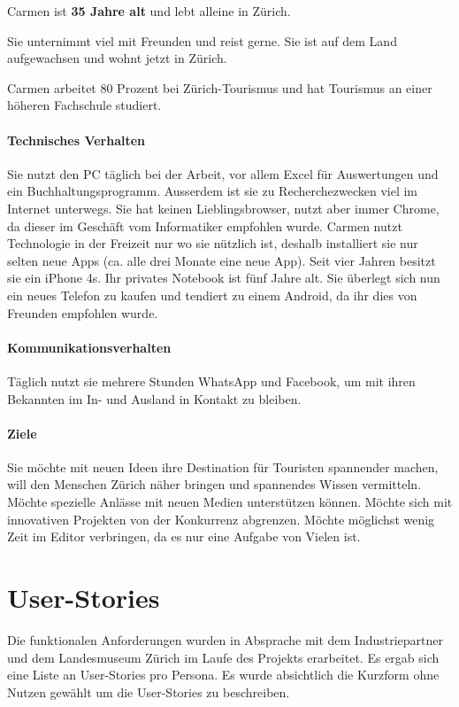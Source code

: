 Carmen ist \textbf{35 Jahre alt} und lebt alleine in Zürich.

Sie unternimmt viel mit Freunden und reist gerne. Sie ist auf dem Land aufgewachsen und wohnt jetzt in Zürich. 

Carmen arbeitet 80 Prozent bei Zürich-Tourismus und hat Tourismus an einer höheren Fachschule studiert.

\paragraph{Technisches Verhalten} 
Sie nutzt den PC täglich bei der Arbeit, vor allem Excel für Auswertungen und ein Buchhaltungsprogramm. Ausserdem ist sie zu Recherchezwecken viel im Internet unterwegs. Sie hat keinen Lieblingsbrowser, nutzt aber immer Chrome, da dieser im Geschäft vom Informatiker empfohlen wurde. Carmen nutzt Technologie in der Freizeit nur wo sie nützlich ist, deshalb installiert sie nur selten neue Apps (ca. alle drei Monate eine neue App). Seit vier Jahren besitzt sie ein iPhone 4s. Ihr privates Notebook ist fünf Jahre alt. Sie überlegt sich nun ein neues Telefon zu kaufen und tendiert zu einem Android, da ihr dies von Freunden empfohlen wurde. 

\paragraph{Kommunikationsverhalten}
Täglich nutzt sie mehrere Stunden WhatsApp und Facebook, um mit ihren Bekannten im In- und Ausland in Kontakt zu bleiben.

\paragraph{Ziele} 
Sie möchte mit neuen Ideen ihre Destination für Touristen spannender machen, will den Menschen Zürich näher bringen und spannendes Wissen vermitteln. Möchte spezielle Anlässe mit neuen Medien unterstützen können. Möchte sich mit innovativen Projekten von der Konkurrenz abgrenzen. Möchte möglichst wenig Zeit im Editor verbringen, da es nur eine Aufgabe von Vielen ist.

\section{User-Stories}

Die funktionalen Anforderungen wurden in Absprache mit dem Industriepartner und dem Landesmuseum Zürich im Laufe des Projekts erarbeitet. Es ergab sich eine Liste an User-Stories pro Persona. Es wurde absichtlich die Kurzform ohne Nutzen gewählt um die User-Stories zu beschreiben.

